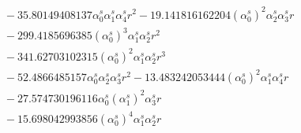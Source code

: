 \documentclass[10pt]{article}
\begin{document}
\begin{align*}
&{}  - 35.80149408137 \alpha_{0}^s \alpha_{1}^s \alpha_{4}^s r^{2} - 19.141816162204 \left(\alpha_{0}^s\right)^{2} \alpha_{2}^s \alpha_{3}^s r \\
&{}  - 299.4185696385 \left(\alpha_{0}^s\right)^{3} \alpha_{1}^s \alpha_{2}^s r^{2} \\
&{}  - 341.62703102315 \left(\alpha_{0}^s\right)^{2} \alpha_{1}^s \alpha_{2}^s r^{3} \\
&{}  - 52.4866485157 \alpha_{0}^s \alpha_{2}^s \alpha_{3}^s r^{2} - 13.483242053444 \left(\alpha_{0}^s\right)^{2} \alpha_{1}^s \alpha_{4}^s r \\
&{}  - 27.574730196116 \alpha_{0}^s \left(\alpha_{1}^s\right)^{2} \alpha_{3}^s r \\
&{}  - 15.698042993856 \left(\alpha_{0}^s\right)^{4} \alpha_{1}^s \alpha_{2}^s r
\end{align*}
\end{document}
